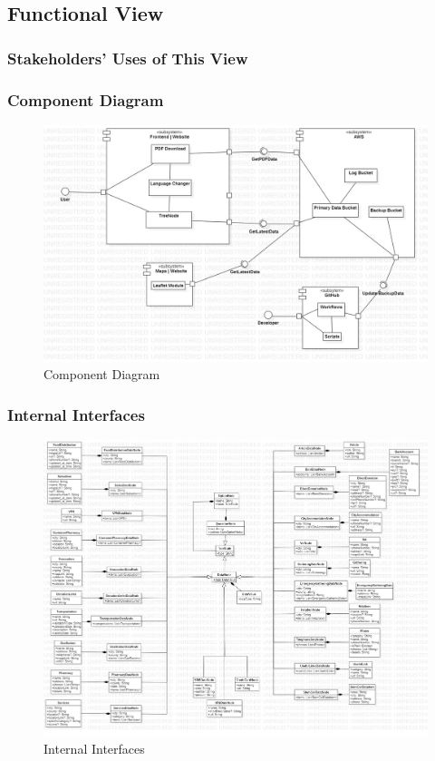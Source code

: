\subsection{Functional View}

\subsubsection{Stakeholders' Uses of This View}

\subsubsection{Component Diagram}

\begin{figure}[H]
  \centering
  \includegraphics[width=\linewidth]{img/component-diagram.jpg}
  \caption{Component Diagram}
\end{figure}

\subsubsection{Internal Interfaces}

\begin{figure}[H]
  \centering
  \includegraphics[width=\linewidth]{img/internal-interfaces-diagram.jpg}
  \caption{Internal Interfaces}
\end{figure}

